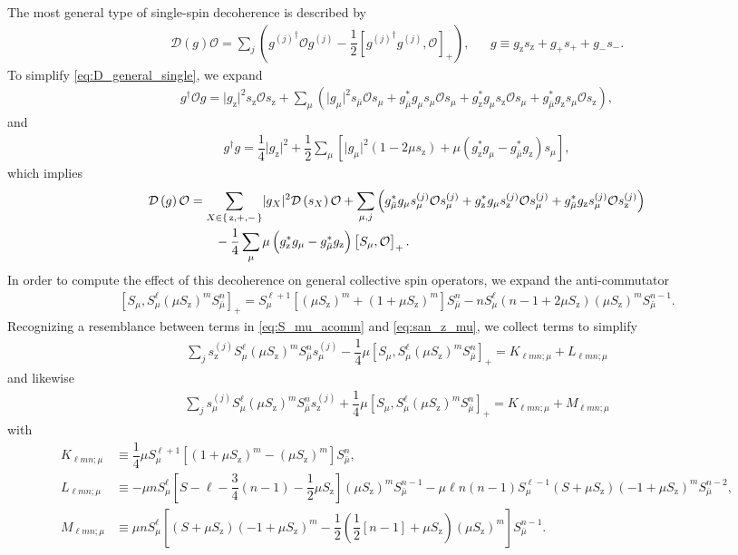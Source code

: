\documentclass[aps,pra,twocolumn,longbibliography]{revtex4-2}
\newcommand{\f}[2]{\dfrac{#1}{#2}} %
\newcommand{\p}[1]{\left( #1 \right)} %
\renewcommand{\sp}[1]{\left[ #1 \right]} %
\renewcommand{\abs}[1]{\lvert #1 \rvert}
\newcommand{\D}{\mathcal{D}}
\renewcommand{\O}{\mathcal{O}}
\newcommand{\z}{\text{z}}
\newcommand{\bmu}{{\bar\mu}}
\newcommand{\1}{\mathds{1}}
\begin{document}
The most general type of single-spin decoherence is described by
\begin{align}
  \D\p{g} \O
  = \sum_j\p{{g^{(j)}}^\dag \O g^{(j)}
    - \f12\sp{{g^{(j)}}^\dag g^{(j)}, \O}_+},
  &&
  g \equiv g_\z s_\z + g_+ s_+ + g_- s_-.
  \label{eq:D_general_single}
\end{align}
To simplify \eqref{eq:D_general_single}, we expand
\begin{align}
  g^\dag \O g
  = \abs{g_\z}^2 s_\z \O s_\z
  + \sum_\mu \p{\abs{g_\mu}^2 s_\bmu \O s_\mu
    + g_\bmu^* g_\mu s_\mu \O s_\mu
    + g_\z^* g_\mu s_\z \O s_\mu
    + g_\bmu^* g_\z s_\mu \O s_\z},
\end{align}
and
\begin{align}
  g^\dag g
  = \f14 \abs{g_\z}^2
  + \f12 \sum_\mu \sp{\abs{g_\mu}^2 \p{1-2\mu s_\z}
    + \mu \p{g_\z^*g_\mu - g_\bmu^*g_\z} s_\mu},
\end{align}
which implies
\begin{align}
  \D\p{g} \O
  &= \sum_{X\in\set{\z,+,-}} \abs{g_X}^2 \D\p{s_X} \O
  + \sum_{\mu,j}
  \p{g_\bmu^* g_\mu s_\mu^{(j)} \O s_\mu^{(j)}
    + g_\z^* g_\mu s_\z^{(j)} \O s_\mu^{(j)}
    + g_\bmu^* g_\z s_\mu^{(j)} \O s_\z^{(j)}}
  \notag \\
  &\qquad -\f14 \sum_\mu \mu
  \p{g_\z^*g_\mu - g_\bmu^*g_\z} \sp{S_\mu, \O}_+.
\end{align}
In order to compute the effect of this decoherence on general
collective spin operators, we expand the anti-commutator
\begin{align}
  \sp{S_\mu, S_\mu^\ell \p{\mu S_\z}^m S_\bmu^n}_+
  = S_\mu^{\ell+1} \sp{\p{\mu S_\z}^m+\p{1+\mu S_\z}^m} S_\bmu^n
  - n S_\mu^\ell \p{n-1+2\mu S_\z} \p{\mu S_\z}^m S_\bmu^{n-1}.
  \label{eq:S_mu_acomm}
\end{align}
Recognizing a resemblance between terms in \eqref{eq:S_mu_acomm} and
\eqref{eq:san_z_mu}, we collect terms to simplify
\begin{align}
  \sum_j s_\z^{(j)} S_\mu^\ell \p{\mu S_\z}^m S_\bmu^n s_\mu^{(j)}
  - \f14 \mu \sp{S_\mu, S_\mu^\ell \p{\mu S_\z}^m S_\bmu^n}_+
  = K_{\ell mn;\mu} + L_{\ell mn;\mu}
  \label{eq:dec_z_mu}
\end{align}
and likewise
\begin{align}
  \sum_j s_\mu^{(j)} S_\mu^\ell \p{\mu S_\z}^m S_\bmu^n s_\z^{(j)}
  + \f14 \mu \sp{S_\mu, S_\mu^\ell \p{\mu S_\z}^m S_\bmu^n}_+
  = K_{\ell mn;\mu} + M_{\ell mn;\mu}
  \label{eq:dec_mu_z}
\end{align}
with
\begin{align}
  K_{\ell mn;\mu}
  &\equiv \f14 \mu S_\mu^{\ell+1}
  \sp{\p{1+\mu S_\z}^m-\p{\mu S_\z}^m} S_\bmu^n, \\
  L_{\ell mn;\mu}
  &\equiv -\mu n S_\mu^\ell \sp{S-\ell-\f34\p{n-1}-\f12\mu S_\z}
  \p{\mu S_\z}^m S_\bmu^{n-1}
  - \mu\ell n\p{n-1} S_\mu^{\ell-1}
  \p{S+\mu S_\z} \p{-1+\mu S_\z}^m S_\bmu^{n-2}, \\
  M_{\ell mn;\mu}
  &\equiv \mu n S_\mu^\ell \sp{\p{S+\mu S_\z}\p{-1+\mu S_\z}^m
    - \f12\p{\f12\sp{n-1}+\mu S_\z}\p{\mu S_\z}^m} S_\bmu^{n-1}.
\end{align}
\end{document}

